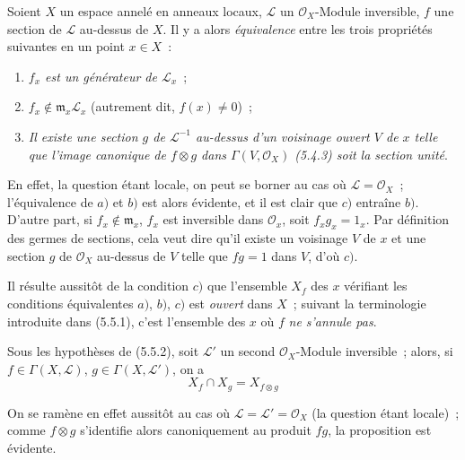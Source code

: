 \begin{env}[5.5.2]
\label{0.5.5.2-fr}
Soient $X$ un espace annelé en anneaux locaux, $\mathcal{L}$ un
$\mathcal{O}_X$-Module inversible, $f$ une section de $\mathcal{L}$ au-dessus
de $X$. Il y a alors \emph{équivalence} entre les trois propriétés suivantes
en un point $x\in X$~:
\begin{enumerate}
  \item[a)] \emph{$f_x$ est un générateur de $\mathcal{L}_x$}~;
  \item[b)] \emph{$f_x\notin\mathfrak{m}_x\mathcal{L}_x$} (autrement dit,
    $f(x)\neq0$)~;
  \item[c)] \emph{Il existe une section $g$ de $\mathcal{L}^{-1}$ au-dessus
    d'un voisinage ouvert $V$ de $x$ telle que l'image canonique de $f\otimes
    g$ dans $\Gamma(V,\mathcal{O}_X)$ \textup{(5.4.3)} soit la section unité}.
\end{enumerate}

En effet, la question étant locale, on peut se borner au cas où
$\mathcal{L}=\mathcal{O}_X$~; l'équivalence de $a)$ et $b)$ est alors
évidente, et il est clair que $c)$ entraîne $b)$. D'autre part, si
$f_x\notin\mathfrak{m}_x$, $f_x$ est inversible dans $\mathcal{O}_x$, soit
$f_xg_x=1_x$. Par définition des germes de sections, cela veut dire qu'il
existe un voisinage $V$ de $x$ et une section $g$ de $\mathcal{O}_X$ au-dessus
de $V$ telle que $fg=1$ dans $V$, d'où $c)$.

Il résulte aussitôt de la condition $c)$ que l'ensemble $X_f$ des $x$
vérifiant les conditions équivalentes $a)$, $b)$, $c)$ est \emph{ouvert} dans
$X$~; suivant la terminologie introduite dans (5.5.1), c'est l'ensemble des
$x$ où $f$ \emph{ne s'annule pas}.
\end{env}

\begin{env}[5.5.3]
\label{0.5.5.3-fr}
Sous les hypothèses de (5.5.2), soit $\mathcal{L}'$ un second
$\mathcal{O}_X$-Module inversible~; alors, si
$f\in\Gamma(X,\mathcal{L})$, $g\in\Gamma(X,\mathcal{L}')$, on a
\[
  X_f\cap X_g=X_{f\otimes g}
\]

On se ramène en effet aussitôt au cas où
$\mathcal{L}=\mathcal{L}'=\mathcal{O}_X$ (la question étant locale)~; comme
$f\otimes g$ s'identifie alors canoniquement au produit $fg$, la proposition
est évidente.
\end{env}



